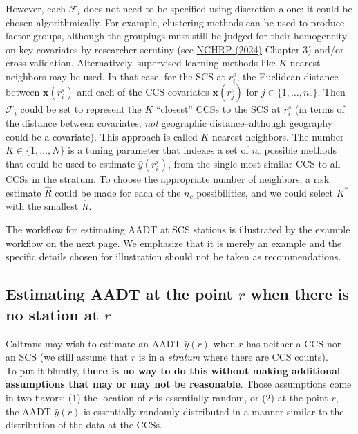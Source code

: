 \documentclass[11pt]{article}
\begin{document}
However, each \(\mathcal{F}_i\) does not need to be specified using
discretion alone: it could be chosen algorithmically. For example,
clustering methods can be used to produce factor groups, although the
groupings must still be judged for their homogeneity on key covariates
by researcher scrutiny (see
\href{https://nap.nationalacademies.org/catalog/27925/guide-on-methods-for-assigning-counts-to-adjustment-factor-groups}{NCHRP
(2024)} Chapter 3) and/or cross-validation. Alternatively, supervised
learning methods like \(K\)-nearest neighbors may be used. In that case,
for the SCS at \(r_i^s\), the Euclidean distance between
\(\mathbf{x}(r_i^s)\) and each of the CCS covariates
\(\mathbf{x}(r_j^c)\) for \(j \in \{1,\ldots,n_c\}\). Then
\(\mathcal{F}_i\) could be set to represent the \(K\) ``closest'' CCSs
to the SCS at \(r_i^s\) (in terms of the distance between covariates,
\emph{not} geographic distance--although geography could be a
covariate). This approach is called \(K\)-nearest neighbors. The number
\(K \in \{1,\ldots,N\}\) is a tuning parameter that indexes a set of
\(n_c\) possible methods that could be used to estimate
\(\bar{y}(r_i^s)\), from the single most similar CCS to all CCSs in the
stratum. To choose the appropriate number of neighbors, a risk estimate
\(\hat{R}\) could be made for each of the \(n_c\) possibilities, and we
could select \(K^*\) with the smallest \(\hat{R}\).


The workflow for estimating AADT at SCS stations is illustrated by the example workflow on the next page. We emphasize that it is merely an example and the specific details chosen for illustration should not be taken as recommendations.




    \subsection{\texorpdfstring{Estimating AADT at the point \(r\) when
there is no station at
\(r\)}{Estimating AADT at the point r when there is no station at r}}\label{estimating-aadt-at-the-point-r-when-there-is-no-station-at-r}

Caltrans may wish to estimate an AADT \(\bar{y}(r)\) when \(r\) has
neither a CCS nor an SCS (we still assume that \(r\) is in a
\emph{stratum} where there are CCS counts).\\
To put it bluntly, \textbf{there is no way to do this without making
additional assumptions that may or may not be reasonable}. Those
assumptions come in two flavors: (1) the location of \(r\) is
essentially random, or (2) at the point \(r\), the AADT \(\bar{y}(r)\)
is essentially randomly distributed in a manner similar to the
distribution of the data at the CCSs.
\end{document}
